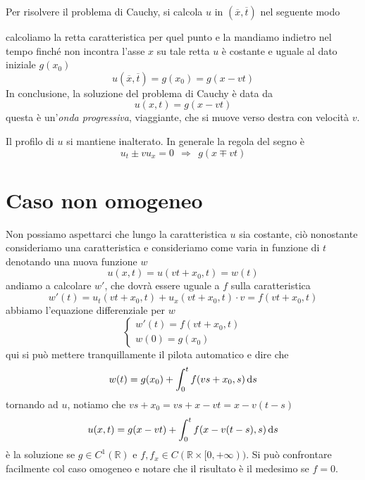 Per risolvere il problema di Cauchy, si calcola $u$ in $(\overline{x} ,\overline{t})$ nel seguente modo


calcoliamo la retta caratteristica per quel punto e la mandiamo indietro nel tempo finché non incontra l'asse $x$ su tale retta $u$ è costante e uguale al dato iniziale $g(x_{0})$
\begin{equation*}
    u(\overline{x} ,\overline{t}) =g(x_{0}) =g(x-vt)
\end{equation*}
In conclusione, la soluzione del problema di Cauchy è data da
\begin{equation}
    u(x,t) =g(x-vt)
\end{equation}
questa è un'\textit{onda progressiva}, viaggiante, che si muove verso destra con velocità $v$.


Il profilo di $u$ si mantiene inalterato. In generale la regola del segno è
\begin{equation*}
    u_{t} \pm vu_{x} =0\ \ \Rightarrow \ \ g(x\mp vt)
\end{equation*}
\section{Caso non omogeneo}
\label{sec:leggi-conservazione-non-omogeneo}

Non possiamo aspettarci che lungo la caratteristica $u$ sia costante, ciò nonostante consideriamo una caratteristica e consideriamo come varia in funzione di $t$ denotando una nuova funzione $w$
\begin{equation*}
    u(x,t) = u(vt+x_{0} ,t) =w(t)
\end{equation*}
andiamo a calcolare $w'$, che dovrà essere uguale a $f$ sulla caratteristica
\begin{equation*}
    w'(t) =u_{t}(vt+x_{0} ,t) +u_{x}(vt+x_{0} ,t) \cdotp v=f(vt+x_{0} ,t)
\end{equation*}
abbiamo l'equazione differenziale per $w$
\begin{equation*}
    \begin{cases}
        w'(t) =f(vt+x_{0} ,t) \\
        w(0) =g(x_{0})
    \end{cases}
\end{equation*}
qui si può mettere tranquillamente il pilota automatico e dire che
\begin{equation*}
    w(t) =g(x_{0}) +\int ^{t}_{0} f(vs+x_{0} ,s) \,\mathrm d s
\end{equation*}
tornando ad $u$, notiamo che $vs+x_{0}=vs+x-vt=x-v(t-s)$
\begin{equation}
    u(x,t) =g(x-vt) +\int ^{t}_{0} f(x-v(t-s) ,s) \,\mathrm d s
\end{equation}
è la soluzione se $g\in C^{1}(\mathbb{R})$ e $f,f_{x} \in C(\mathbb{R} \times [ 0,+\infty))$. Si può confrontare facilmente col caso omogeneo e notare che il risultato è il medesimo se $f=0$.

